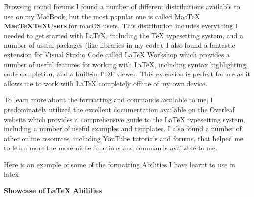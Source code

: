 Browsing round forums I found a number of different distributions available to use on my MacBook, but the most popular one is called MacTeX \textbf{MacTeXTeXUsers} for macOS users. This distribution includes everything I needed to get started with \LaTeX{}, including the \TeX{} typesetting system, and a number of useful packages (like libraries in my code). I also found a fantastic extension for Visual Studio Code called LaTeX Workshop which provides a number of useful features for working with \LaTeX{}, including syntax highlighting, code completion, and a built-in PDF viewer. This extension is perfect for me as it allows me to work with \LaTeX{} completely offline of my own device.

To learn more about the formatting and commands available to me, I predominately utilized the excellent documentation available on the Overleaf website \cite{DocumentationOverleafOnline} which provides a comprehensive guide to the \LaTeX{} typesetting system, including a number of useful examples and templates. I also found a number of other online resources, including YouTube tutorials and forums, that helped me to learn more the more niche functions and commands available to me.

Here is an example of some of the formatting Abilities I have learnt to use in latex 
\begin{center}
    \Huge \textbf{Showcase of \LaTeX{} Abilities}
\end{center}

